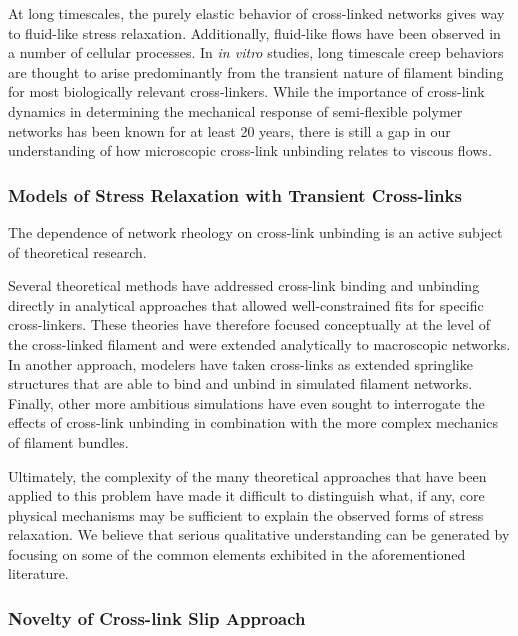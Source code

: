 \documentclass[pre,preprint]{revtex4-1}
\begin{document}
At long timescales, the purely elastic behavior of cross-linked networks gives way to fluid-like stress relaxation. Additionally, fluid-like flows have been observed in a number of cellular processes\cite{cellmech_flows,cellmech_flows2,cellmech_flows3,rheo_fluid,rheo_fluid2,cell_rheo_exp}.  In {\em in vitro} studies, long timescale creep behaviors are thought to arise predominantly from the transient nature of filament binding for most biologically relevant cross-linkers\cite{rheo_crosslinkslip1,rheo_crosslinkslip2,rheo_crosslinkslip3,rheo_nonaffine}.  While the importance of cross-link dynamics in determining the mechanical response of semi-flexible polymer networks has been known for at least 20 years\cite{rheo_crosslinksmatter}, there is still a gap in our understanding of how microscopic cross-link unbinding relates to viscous flows. 

\subsubsection{Models of Stress Relaxation with Transient Cross-links}

The dependence of network rheology on cross-link unbinding is an active subject of theoretical research\cite{theo_crosslinkslip2}.  

Several theoretical methods have addressed cross-link binding and unbinding directly \cite{theo_crosslinkslip1,theo_crosslinkslip2} in analytical approaches that allowed well-constrained fits for specific cross-linkers.  These theories have therefore focused conceptually at the level of the cross-linked filament and were extended analytically to macroscopic networks.  In another approach, modelers have taken cross-links as extended springlike structures \cite{model_taeyoon} that are able to bind and unbind in simulated filament networks. Finally, other more ambitious simulations have even sought to interrogate the effects of cross-link unbinding in combination with the more complex mechanics of filament bundles\cite{rheo_crosslinkslip2,theo_crosslinkslip3}.

Ultimately, the complexity of the many theoretical approaches that have been applied to this problem have made it difficult to distinguish what, if any, core physical mechanisms may be sufficient to explain the observed forms of stress relaxation.  We believe that serious qualitative understanding can be generated by focusing on some of the common elements exhibited in the aforementioned literature.

\subsubsection{Novelty of Cross-link Slip Approach}
\end{document}
